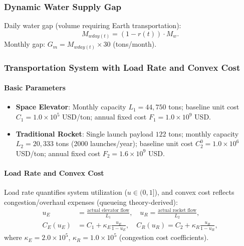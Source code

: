 \documentclass{mcmthesis}
\begin{document}
\subsubsection{Dynamic Water Supply Gap}
Daily water gap (volume requiring Earth transportation):
\begin{equation}
    M_{wday(t)}=(1 - r(t))\cdot M_w.
\end{equation}
Monthly gap: $G_m = M_{wday(t)} \times 30$ (tons/month).

\subsubsection{Transportation System with Load Rate and Convex Cost}
\paragraph{Basic Parameters}
\begin{itemize}
\item \textbf{Space Elevator}: Monthly capacity $L_1=44,750$ tons; baseline unit cost $C_1=1.0\times10^5$ USD/ton; annual fixed cost $F_1=1.0\times10^9$ USD.
\item \textbf{Traditional Rocket}: Single launch payload $122$ tons; monthly capacity $L_2=20,333$ tons (2000 launches/year); baseline unit cost $C_2^0=1.0\times10^6$ USD/ton; annual fixed cost $F_2=1.6\times10^9$ USD.
\end{itemize}

\paragraph{Load Rate and Convex Cost}
Load rate quantifies system utilization ($u \in (0,1]$), and convex cost reflects congestion/overhaul expenses (queueing theory-derived):
\begin{align}
u_E &= \frac{\text{actual elevator flow}}{L_1}, \quad u_R = \frac{\text{actual rocket flow}}{L_2}, \\
C_E(u_E) &= C_1 + \kappa_E\frac{u_E}{1-u_E}, \quad C_R(u_R) = C_2 + \kappa_R\frac{u_R}{1-u_R}
,\end{align}
where $\kappa_E=2.0\times10^5$, $\kappa_R=1.0\times10^5$ (congestion cost coefficients).
\end{document}
